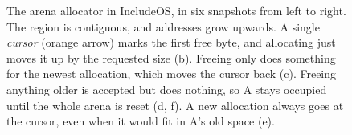 \begin{figure}[tbp]
\caption{The arena allocator in IncludeOS, in six snapshots from left
  to right. The region is contiguous, and addresses grow upwards. A single
  \emph{cursor} (orange arrow) marks the first free byte, and allocating
  just moves it up by the requested size (b). Freeing only does something
  for the newest allocation, which moves the cursor back (c). Freeing
  anything older is accepted but does nothing, so A stays occupied until
  the whole arena is reset (d, f). A new allocation always goes at the
  cursor, even when it would fit in A's old space (e).}
\label{fig:arena-alloc}
\end{figure}
